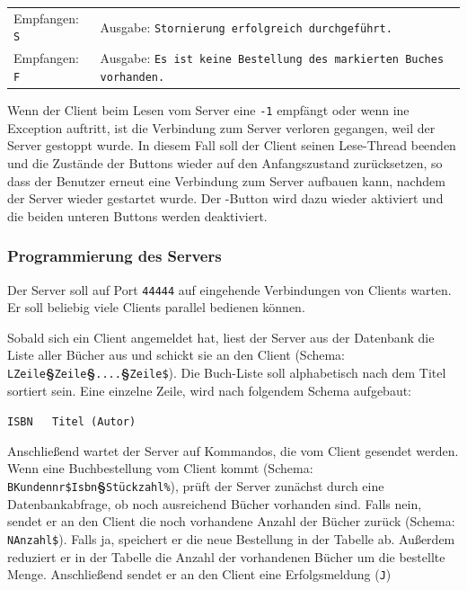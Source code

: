 \bgroup
\def\arraystretch{1.2}
\begin{tabularx}{\textwidth}{p{30mm} X}
Empfangen: \lstinline|S| &
Ausgabe: \lstinline|Stornierung erfolgreich durchgeführt.| \\
Empfangen: \lstinline|F| &
Ausgabe: \lstinline|Es ist keine Bestellung des markierten Buches vorhanden.|
\\
\end{tabularx}
\egroup

Wenn der Client beim Lesen vom Server eine \lstinline|-1| empfängt oder wenn
ine Exception auftritt, ist die Verbindung zum Server verloren gegangen, weil
der Server gestoppt wurde. In diesem Fall soll der Client seinen Lese-Thread
beenden und die Zustände der Buttons wieder auf den Anfangszustand
zurücksetzen, so dass der Benutzer erneut eine Verbindung zum Server aufbauen
kann, nachdem der Server wieder gestartet wurde. Der
-Button wird dazu wieder aktiviert und die beiden unteren
Buttons werden deaktiviert.


\subsubsection{Programmierung des Servers}

Der Server soll auf Port \lstinline|44444| auf eingehende Verbindungen von
Clients warten. Er soll beliebig viele Clients parallel bedienen können.

Sobald sich ein Client angemeldet hat, liest der Server aus der Datenbank die
Liste aller Bücher aus  und schickt sie an den Client (Schema:
\lstinline|LZeile|\textbf{§}\lstinline|Zeile|\textbf{§}\lstinline|....|\textbf{§}\lstinline|Zeile$|).
Die Buch-Liste soll alphabetisch nach dem Titel sortiert sein. Eine einzelne
Zeile, wird nach folgendem Schema aufgebaut:

\lstinline|ISBN   Titel (Autor)|

Anschließend wartet der Server auf Kommandos, die vom Client gesendet werden.
Wenn eine Buchbestellung vom Client kommt (Schema: 
\lstinline|BKundennr$Isbn|\textbf{§}\lstinline|Stückzahl%|), prüft der Server
zunächst durch eine Datenbankabfrage, ob noch ausreichend Bücher vorhanden
sind. Falls nein, sendet er an den Client die noch vorhandene Anzahl der Bücher
zurück (Schema: \lstinline|NAnzahl$|). Falls ja, speichert er die neue
Bestellung in der Tabelle  ab. Außerdem reduziert er in
der Tabelle  die Anzahl der vorhandenen Bücher um die
bestellte Menge. Anschließend sendet er an den Client eine Erfolgsmeldung
(\lstinline|J|)

